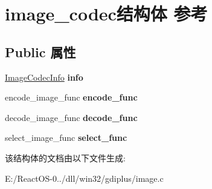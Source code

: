 \hypertarget{structimage__codec}{}\section{image\+\_\+codec结构体 参考}
\label{structimage__codec}
\subsection*{Public 属性}
\begin{DoxyCompactItemize}
\item 
\mbox{\label{structimage__codec_abd7b41f040cb069b6db11cd9b954e53c}} 
\hyperlink{struct_image_codec_info}{Image\+Codec\+Info} {\bfseries info}
\item 
\mbox{\label{structimage__codec_aad092e6a093ed6b46f576142a2e3d9a4}} 
encode\+\_\+image\+\_\+func {\bfseries encode\+\_\+func}
\item 
\mbox{\label{structimage__codec_aaa7bae68ff3c8e74c90935305a43d35a}} 
decode\+\_\+image\+\_\+func {\bfseries decode\+\_\+func}
\item 
\mbox{\label{structimage__codec_a2f07c7fabb1b5747a94a1b0dd8e5e0fb}} 
select\+\_\+image\+\_\+func {\bfseries select\+\_\+func}
\end{DoxyCompactItemize}


该结构体的文档由以下文件生成\+:\begin{DoxyCompactItemize}
\item 
E\+:/\+React\+O\+S-\/0../dll/win32/gdiplus/image.\+c\end{DoxyCompactItemize}
